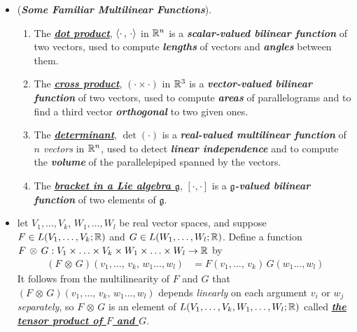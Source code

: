 \documentclass[11pt]{article}
\begin{document}
\begin{itemize}
\item \begin{example} (\emph{\textbf{Some Familiar Multilinear Functions}}).\\
\begin{enumerate}
\item The \underline{\emph{\textbf{dot product}}}, $\left\langle \cdot\,,\, \cdot \right\rangle$ in ${\mathbb R}^n$ is a \emph{\textbf{scalar-valued bilinear function}} of two vectors, used
to compute \emph{\textbf{lengths}} of vectors and \emph{\textbf{angles}} between them.
\item The \underline{\emph{\textbf{cross product}}}, $(\cdot \times \cdot)$ in ${\mathbb R}^3$ is a \emph{\textbf{vector-valued bilinear function}} of two vectors, used
to compute \emph{\textbf{areas}} of parallelograms and to find a third vector \emph{\textbf{orthogonal}} to two given ones.
\item The \underline{\emph{\textbf{determinant}}}, $\det(\cdot)$ is a \emph{\textbf{real-valued multilinear function}} of \emph{$n$ vectors} in ${\mathbb R}^n$, used
to detect \emph{\textbf{linear independence}} and to compute the \emph{\textbf{volume}} of the parallelepiped spanned by the vectors.
\item The \underline{\emph{\textbf{bracket in a Lie algebra $\mathfrak{g}$}}}, $[\cdot, \cdot]$ is a \emph{\textbf{$\mathfrak{g}$-valued bilinear function}} of two elements of $\mathfrak{g}$.
\end{enumerate}
\end{example}

\item \begin{definition}
let $V_1,\ldots,V_k$, $W_1,\ldots,W_l$ be real vector spaces, and suppose $F \in L(V_1,\ldots,V_k ; {\mathbb R})$ and $G \in L(W_1,\ldots,W_l; {\mathbb R})$. Define a function
$F\, \otimes \, G: V_1\times \ldots \times V_k \times W_1\times \ldots \times W_l \rightarrow {\mathbb R}$
by
\begin{align}
(F\, \otimes \, G)(v_1,\ldots,\,v_k,\,w_1 \ldots, w_l)&= F(v_1,\ldots,\,v_k)\,G(w_1 \ldots, w_l) \label{eqn: tensor_product}
\end{align} It follows from the multilinearity of $F$ and $G$ that $(F\, \otimes \, G)(v_1,\ldots,\,v_k,\,w_1 \ldots, w_l)$ depends \emph{linearly} on each argument $v_i$ or $w_j$ \emph{separately}, so $F\, \otimes \, G$ is an element of $L(V_1,\ldots,V_k, W_1,\ldots,W_l; {\mathbb R})$ called \underline{\emph{\textbf{the tensor product of $F$ and $G$}}}.
\end{definition}


\end{itemize}
\end{document}
